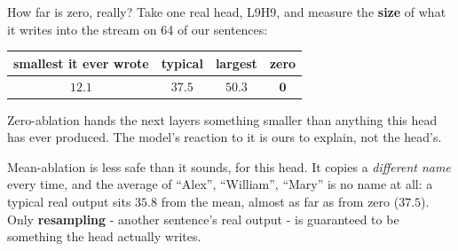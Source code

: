 \documentclass[aspectratio=169]{beamer}
\newcommand{\watchbox}[1]{%
  \begin{tcolorbox}[colback=armorange!12, colframe=armorange, boxrule=0.6pt, arc=2pt]
  #1
  \end{tcolorbox}}
\begin{document}
\begin{frame}{How far is zero, really?}
  \vspace{0.2em}
  Take one real head, L9H9, and measure the \textbf{size} of what it writes into the stream on 64
  of our sentences:

  \vspace{0.3em}
  \begin{center}
  \small
  \begin{tabular}{@{}cccc@{}}
    \toprule
    smallest it ever wrote & typical & largest & \textbf{zero}\\
    \midrule
    $12.1$ & $37.5$ & $50.3$ & $\mathbf{0}$\\
    \bottomrule
  \end{tabular}
  \end{center}

  \vspace{0.3em}
  Zero-ablation hands the next layers something smaller than anything this head has ever
  produced. The model's reaction to it is ours to explain, not the head's.

  \vspace{0.3em}
  \watchbox{\small Mean-ablation is less safe than it sounds, for this head. It copies a
  \emph{different name} every time, and the average of ``Alex'', ``William'', ``Mary'' is no name
  at all: a typical real output sits $35.8$ from the mean, almost as far as from zero ($37.5$).
  Only \textbf{resampling} - another sentence's real output - is guaranteed to be something the
  head actually writes.}
\end{frame}
\end{document}

